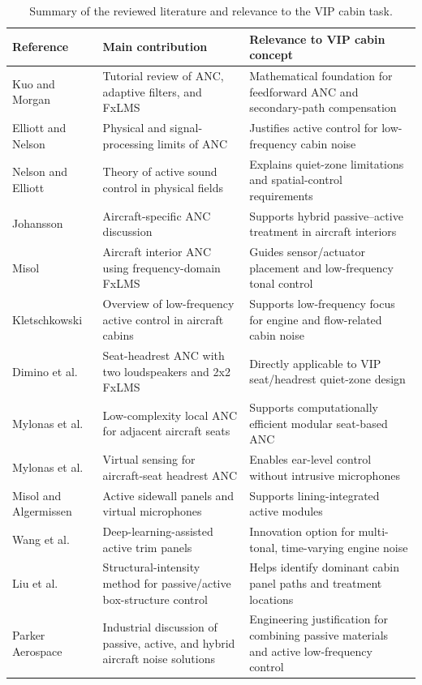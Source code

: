 \begin{table}[h]
    \centering
    \caption{Summary of the reviewed literature and relevance to the VIP cabin task.}
    \label{tab:literature-summary}
    \small
    \begin{tabularx}{\textwidth}{p{}p{}X}
        \toprule
        \textbf{Reference} & \textbf{Main contribution} & \textbf{Relevance to VIP cabin concept} \\
        \midrule
        Kuo and Morgan \cite{kuo1999active} & Tutorial review of ANC, adaptive filters, and FxLMS & Mathematical foundation for feedforward ANC and secondary-path compensation \\
        Elliott and Nelson \cite{elliott1993active} & Physical and signal-processing limits of ANC & Justifies active control for low-frequency cabin noise \\
        Nelson and Elliott \cite{nelson1992active} & Theory of active sound control in physical fields & Explains quiet-zone limitations and spatial-control requirements \\
        Johansson \cite{johansson2015active} & Aircraft-specific ANC discussion & Supports hybrid passive--active treatment in aircraft interiors \\
        Misol \cite{misol2023design} & Aircraft interior ANC using frequency-domain FxLMS & Guides sensor/actuator placement and low-frequency tonal control \\
        Kletschkowski \cite{kletschkowski2020insights} & Overview of low-frequency active control in aircraft cabins & Supports low-frequency focus for engine and flow-related cabin noise \\
        Dimino et al. \cite{dimino2022active} & Seat-headrest ANC with two loudspeakers and 2x2 FxLMS & Directly applicable to VIP seat/headrest quiet-zone design \\
        Mylonas et al. \cite{mylonas2023low} & Low-complexity local ANC for adjacent aircraft seats & Supports computationally efficient modular seat-based ANC \\
        Mylonas et al. \cite{mylonas2024virtual} & Virtual sensing for aircraft-seat headrest ANC & Enables ear-level control without intrusive microphones \\
        Misol and Algermissen \cite{misol2020sidewall} & Active sidewall panels and virtual microphones & Supports lining-integrated active modules \\
        Wang et al. \cite{wang2025deep} & Deep-learning-assisted active trim panels & Innovation option for multi-tonal, time-varying engine noise \\
        Liu et al. \cite{liu2006passive} & Structural-intensity method for passive/active box-structure control & Helps identify dominant cabin panel paths and treatment locations \\
        Parker Aerospace \cite{parkerWhitepaper} & Industrial discussion of passive, active, and hybrid aircraft noise solutions & Engineering justification for combining passive materials and active low-frequency control \\
        \bottomrule
    \end{tabularx}
\end{table}

